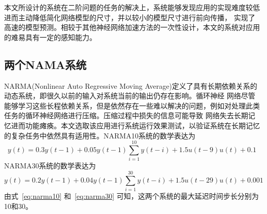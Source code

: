 本文所设计的系统在二阶问题的任务的解决上，系统能够发现应用的实现难度较低进而主动降低简化网络模型的尺寸，并以较小的模型尺寸进行前向传播，
实现了高速的模型预测。相较于其他神经网络加速方法的一次性设计，本文的系统对应用的难易具有一定的感知能力。

\subsection{两个NAMA系统}

NARMA(Nonlinear Auto Regressive Moving Average)定义了具有长期依赖关系的动态系统，即很久以前的输入对系统当前的输出仍存在影响。循环神经
网络尽管能够学习这些长程依赖关系，但是依然存在一些难以解决的问题，例如对处理此类任务的循环神经网络进行压缩。压缩过程中损失的信息可能导致
网络失去长期记忆进而功能瘫痪。本文选取该应用进行系统运行效果测试，以验证系统在长期记忆的复杂任务中依然具有适用性。NARMA10系统的数学表达为
\begin{equation}
	y(t) = 0.3y(t-1) + 0.05y(t-1)\sum_{i=1}^{10}y(t-i) + 1.5u(t-9)u(t) + 0.1
\label{eq:narma10}
\end{equation}
NARMA30系统的数学表达为
\begin{equation}
	y(t) = 0.2y(t-1) + 0.04y(t-1)\sum_{i=1}^{30}y(t-i) + 1.5u(t-29)u(t) + 0.001
\label{eq:narma30}
\end{equation}
由式~\ref{eq:narma10} 和~\ref{eq:narma30} 可知，这两个系统的最大延迟时间步长分别为10和30。
